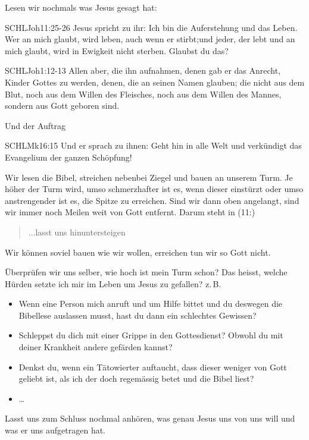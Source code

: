 \documentclass[12pt]{../../inc/mybib}
\newcommand{\q}[1]{\blockquote{#1}}
\newenvironment{block}[1][]{%
  \vspace{1.5em}%
  \noindent\textbf{#1}\par%
  \vspace{0.0em}%
}{%
  \vspace{1em}%
}
\begin{document}
\begin{block}
    Lesen wir nochmals was Jesus gesagt hat:
    \begin{bibelbox}{SCHL}{Joh}{11:25-26}
        Jesus spricht zu ihr: Ich bin die Auferstehung und das Leben. Wer an mich glaubt, wird leben, auch wenn er stirbt;und jeder, der lebt und an mich glaubt, wird in Ewigkeit nicht sterben. Glaubst du das?
    \end{bibelbox} 
    \begin{bibelbox}{SCHL}{Joh}{1:12-13}
        Allen aber, die ihn aufnahmen, denen gab er das Anrecht, Kinder Gottes zu werden, denen, die an seinen Namen glauben;
        die nicht aus dem Blut, noch aus dem Willen des Fleisches, noch aus dem Willen des Mannes, sondern aus Gott geboren sind.
    \end{bibelbox}     
    Und der Auftrag
    \begin{bibelbox}{SCHL}{Mk}{16:15}
        Und er sprach zu ihnen: Geht hin in alle Welt und verkündigt das Evangelium der ganzen Schöpfung!
    \end{bibelbox} 
    Wir lesen die Bibel, streichen nebenbei Ziegel und bauen an unserem Turm. Je höher der Turm wird, umso schmerzhafter ist es, wenn dieser einstürzt oder umso anstrengender ist es, die Spitze zu erreichen. Sind wir dann oben angelangt, sind wir immer noch Meilen weit von Gott entfernt. Darum steht in (11:) \q{...lasst uns hinuntersteigen}. Wir können soviel bauen wie wir wollen, erreichen tun wir so Gott nicht.

    Überprüfen wir uns selber, wie hoch ist mein Turm schon? Das heisst, welche Hürden setzte ich mir im Leben um Jesus zu gefallen? z.\,B. 
    \begin{itemize}
        \item Wenn eine Person mich anruft und um Hilfe bittet und du deswegen die Bibellese auslassen musst, hast du dann ein schlechtes Gewissen?
        \item Schleppst du dich mit einer Grippe in den Gottesdienst? Obwohl du mit deiner Krankheit andere gefärden kannst?
        \item Denkst du, wenn ein Tätowierter auftaucht, dass dieser weniger von Gott geliebt ist, als ich der doch regemässig betet und die Bibel liest?
        \item \dots
    \end{itemize}
            
\end{block}
    Lasst uns zum Schluss nochmal anhören, was genau Jesus uns von uns will und was er uns aufgetragen hat. 
\end{document}
